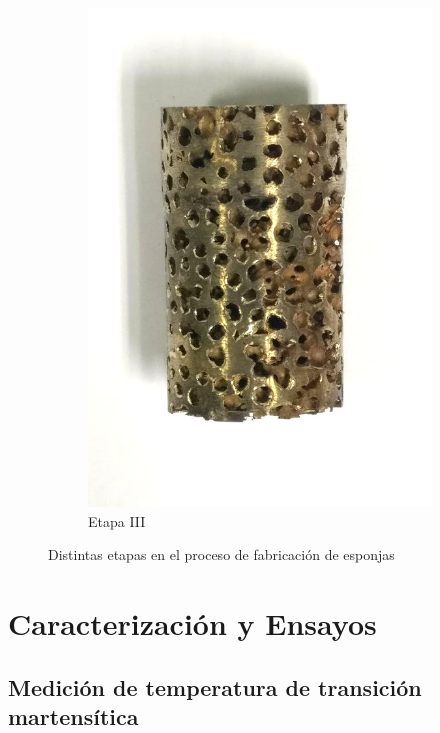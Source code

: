 \documentclass[a4paper,12pt,fleqn,twoside,openany]{book}
\begin{document}
\begin{figure}[h]
\begin{subfigure}{0.28\textwidth}
        \includegraphics[width=\textwidth]{Img/Procedimiento/proceso3.jpg}
        \caption{Etapa III}
        \label{fig:proceso3}
    \end{subfigure}
  \label{fig: proceso}
  \caption{Distintas etapas en el proceso de fabricación de esponjas}
\end{figure}


\section{Caracterización y Ensayos}



\subsection{Medición de temperatura de transición martensítica}
\end{document}
